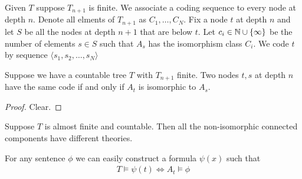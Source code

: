 \documentclass{amsart}
\begin{document}
\begin{Definition} \label{df_coding}
	Given $T$ suppose $T_{n+1}$ is finite. We associate a coding sequence to every node at depth $n$.
	Denote all elments of $T_{n+1}$ as $C_1, \ldots, C_N$.
	Fix a node $t$ at depth $n$ and let $S$ be all the nodes at depth $n+1$ that are below $t$.
	Let $c_i \in \mathbb{N} \cup \{\infty\}$ be the number of elements $s \in S$ such that $A_s$ has the isomorphism class $C_i$.
	We code $t$ by sequence $\langle s_1, s_2, \ldots, s_N \rangle$
\end{Definition}


\begin{Lemma} \label{lm_tree_code}
	Suppose we have a countable tree $T$ with $T_{n+1}$ finite. Two nodes $t,s$ at depth $n$ have the same code if and only if $A_t$ is isomorphic to $A_s$.
\end{Lemma}

\begin{proof}
	Clear.
\end{proof}

\begin{Lemma} \label{lm_categoricity}
	Suppose $T$ is almost finite and countable. Then all the non-isomorphic connected components have different theories.
\end{Lemma}

\begin{Note}
	For any sentence $\phi$ we can easily construct a formula $\psi(x)$ such that
	\begin{align*}
		T \models \psi(t) \iff A_t \models \phi
	\end{align*}
\end{Note}
\end{document}
